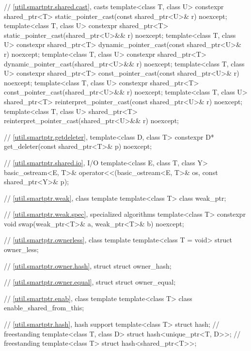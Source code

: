 \begin{codeblock}
{  // \ref{util.smartptr.shared.cast},  casts
  template<class T, class U>
    constexpr shared_ptr<T> static_pointer_cast(const shared_ptr<U>& r) noexcept;
  template<class T, class U>
    constexpr shared_ptr<T> static_pointer_cast(shared_ptr<U>&& r) noexcept;
  template<class T, class U>
    constexpr shared_ptr<T> dynamic_pointer_cast(const shared_ptr<U>& r) noexcept;
  template<class T, class U>
    constexpr shared_ptr<T> dynamic_pointer_cast(shared_ptr<U>&& r) noexcept;
  template<class T, class U>
    constexpr shared_ptr<T> const_pointer_cast(const shared_ptr<U>& r) noexcept;
  template<class T, class U>
    constexpr shared_ptr<T> const_pointer_cast(shared_ptr<U>&& r) noexcept;
  template<class T, class U>
    shared_ptr<T> reinterpret_pointer_cast(const shared_ptr<U>& r) noexcept;
  template<class T, class U>
    shared_ptr<T> reinterpret_pointer_cast(shared_ptr<U>&& r) noexcept;

  // \ref{util.smartptr.getdeleter},  
  template<class D, class T>
    constexpr D* get_deleter(const shared_ptr<T>& p) noexcept;

  // \ref{util.smartptr.shared.io},  I/O
  template<class E, class T, class Y>
    basic_ostream<E, T>& operator<<(basic_ostream<E, T>& os, const shared_ptr<Y>& p);

  // \ref{util.smartptr.weak}, class template 
  template<class T> class weak_ptr;

  // \ref{util.smartptr.weak.spec},  specialized algorithms
  template<class T> constexpr void swap(weak_ptr<T>& a, weak_ptr<T>& b) noexcept;

  // \ref{util.smartptr.ownerless}, class template 
  template<class T = void> struct owner_less;

  // \ref{util.smartptr.owner.hash}, struct 
  struct owner_hash;

  // \ref{util.smartptr.owner.equal}, struct 
  struct owner_equal;

  // \ref{util.smartptr.enab}, class template 
  template<class T> class enable_shared_from_this;

  // \ref{util.smartptr.hash}, hash support
  template<class T> struct hash;                                                    // freestanding
  template<class T, class D> struct hash<unique_ptr<T, D>>;                         // freestanding
  template<class T> struct hash<shared_ptr<T>>;

}
\end{codeblock}
